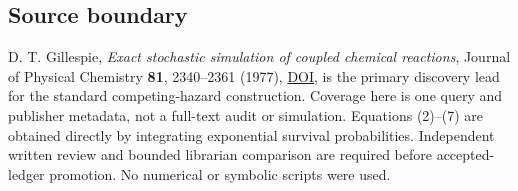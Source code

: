\documentclass[11pt,a4paper]{article}
\begin{document}
\hypertarget{source-boundary}{%
\subsection{Source boundary}\label{source-boundary}}

D. T. Gillespie, \emph{Exact stochastic simulation of coupled chemical
reactions}, Journal of Physical Chemistry \textbf{81}, 2340--2361
(1977), \href{https://doi.org/10.1021/j100540a008}{DOI}, is the primary
discovery lead for the standard competing-hazard construction. Coverage
here is one query and publisher metadata, not a full-text audit or
simulation. Equations (2)--(7) are obtained directly by integrating
exponential survival probabilities. Independent written review and
bounded librarian comparison are required before accepted-ledger
promotion. No numerical or symbolic scripts were used.
\end{document}

